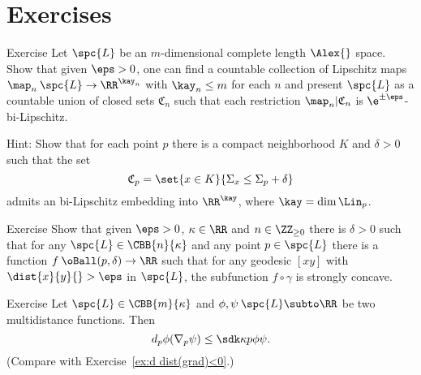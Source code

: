 \section{Exercises}

\begin{thm}{Exercise}
Let $\spc{L}$ be an $m$-dimensional complete length $\Alex{}$ space.
Show that given $\eps>0$,
one can find a countable collection of Lipschitz maps $\map_n\:\spc{L}\to \RR^{\kay_n}$ 
with $\kay_n\le m$ for each $n$
and present $\spc{L}$ as a countable union of closed sets $\mathfrak C_n$ such that each restriction 
$\map_n|\mathfrak C_n$ is $\e^{\pm\eps}$-bi-Lipschitz.
\end{thm}



Hint: Show that for each point $p$ there is a compact neighborhood $K$ and $\delta>0$ such that the set 
\[\mathfrak C_p=\set{x\in K}{\Sigma_x\le \Sigma_p+\delta}\]
admits an bi-Lipschitz embedding into $\RR^\kay$, where $\kay=\dim\Lin_p$.

\begin{thm}{Exercise}
Show that given $\eps>0$, $\kappa\in\RR$ and $n\in\ZZ_{\ge0}$ there is $\delta>0$ such that for any $\spc{L}\in\CBB{n}{\kappa}$ and any point $p\in\spc{L}$ there is a function $f\:\oBall(p,\delta)\to\RR$
such that for any geodesic $[xy]$ with $\dist{x}{y}{}>\eps$ in $\spc{L}$,
the subfunction $f\circ\gamma$ is strongly concave.
\end{thm}






\begin{thm}{Exercise}\label{ex:d(grad)<0}
Let $\spc{L}\in\CBB{m}{\kappa}$ and
$\phi,\psi\:\spc{L}\subto\RR$ be two multidistance functions.
Then 
\[d_p\phi(\nabla_p\psi)
\le
\sdk\kappa{p}{\phi}{\psi}.\]
(Compare with Exercise~\ref{ex:d dist(grad)<0}.)
\end{thm}



